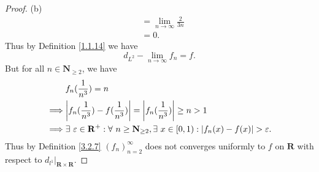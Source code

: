 \begin{proof}{(b)}
\begin{align*}
                                            & = \lim_{n \to \infty} \frac{2}{3n}                                                                                 \\
                                            & = 0.
    \end{align*}
    Thus by Definition \ref{1.1.14} we have
    \[
        d_{L^2} - \lim_{n \to \infty} f_n = f.
    \]
    But for all \(n \in \mathbf{N}_{\geq 2}\), we have
    \begin{align*}
                 & f_n(\frac{1}{n^3}) = n                                                                                                                   \\
        \implies & \abs*{f_n(\frac{1}{n^3}) - f(\frac{1}{n^3})} = \abs*{f_n(\frac{1}{n^3})} \geq n > 1                                                      \\
        \implies & \exists\ \varepsilon \in \mathbf{R}^+ : \forall\ n \geq \mathbf{N}_{\geq 2}, \exists\ x \in [0, 1) : \abs*{f_n(x) - f(x)} > \varepsilon.
    \end{align*}
    Thus by Definition \ref{3.2.7} \((f_n)_{n = 2}^\infty\) does not converges uniformly to \(f\) on \(\mathbf{R}\) with respect to \(d_{l^1}|_{\mathbf{R} \times \mathbf{R}}\).
\end{proof}